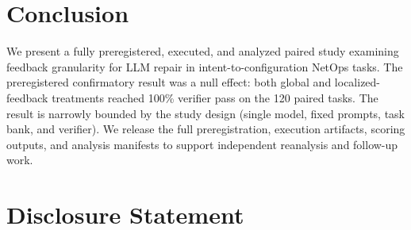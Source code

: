 \documentclass[conference]{IEEEtran}
\begin{document}
\section{Conclusion}
We present a fully preregistered, executed, and analyzed paired study examining feedback granularity for LLM repair in intent-to-configuration NetOps tasks. The preregistered confirmatory result was a null effect: both global and localized-feedback treatments reached 100\% verifier pass on the 120 paired tasks. The result is narrowly bounded by the study design (single model, fixed prompts, task bank, and verifier). We release the full preregistration, execution artifacts, scoring outputs, and analysis manifests to support independent reanalysis and follow-up work.

\section*{Disclosure Statement}
\end{document}
